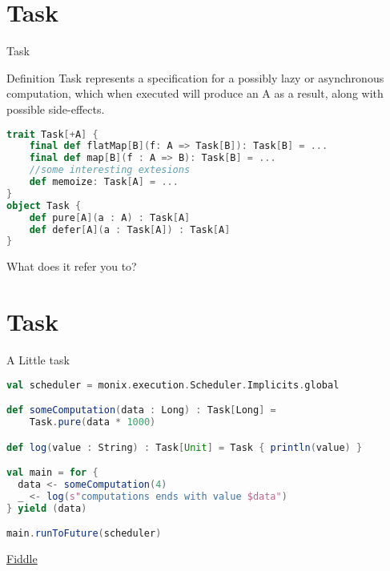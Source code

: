 \documentclass[presentation]{beamer}
\begin{document}
\section{Task}
\begin{frame}[fragile]{Task}

\begin{block}{Definition}
  Task represents a specification for a possibly lazy or asynchronous computation, which when executed will produce an A as a result, along with possible side-effects.
\end{block}
\begin{lstlisting}[language=Scala]
  trait Task[+A] {
    final def flatMap[B](f: A => Task[B]): Task[B] = ...
    final def map[B](f : A => B): Task[B] = ...
    //some interesting extesions
    def memoize: Task[A] = ...
}
object Task {
    def pure[A](a : A) : Task[A]
    def defer[A](a : Task[A]) : Task[A]
}
\end{lstlisting}
\begin{center}
  What does it refer you to?
\end{center}

\end{frame}

\section{Task}
\begin{frame}[fragile]{A Little task}

\begin{lstlisting}[language=Scala]
val scheduler = monix.execution.Scheduler.Implicits.global

def someComputation(data : Long) : Task[Long] = 
    Task.pure(data * 1000)

def log(value : String) : Task[Unit] = Task { println(value) }

val main = for {
  data <- someComputation(4)
  _ <- log(s"computations ends with value $data")
} yield (data)

main.runToFuture(scheduler)
\end{lstlisting}
\begin{center}
  \href{https://scalafiddle.io/sf/C4Qon6a/1}{Fiddle}
\end{center}

\end{frame}
\end{document}
